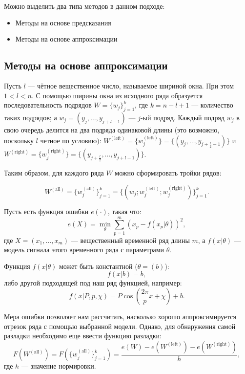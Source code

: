 \documentclass[%
12pt,
master,  %
natbib,      %
subf,        %
substylefile = spbu.rtx,
href,        %
colorlinks,  %
]{disser}
\begin{document}
Можно выделить два типа методов в данном подходе:
\begin{itemize}
	\item Методы на основе предсказания
	\item Методы на основе аппроксимации
\end{itemize}

\subsection{Методы на основе аппроксимации}

Пусть $l$ --- чётное вещественное число, называемое шириной окна. При этом  $ 1 < l < n $. С помощью ширины окна из исходного ряда образуется последовательность подрядов $W = \{ w_j \}_{j=1}^k$, где $k = n - l + 1$ --- количество таких подрядов; а $ w_j = (y_j, \dots, y_{j+l-1}) $ --- $j$-ый подряд. Каждый подряд  $w_j$  в свою очередь делится на два подряда одинаковой длины (это возможно, поскольку $l$ четное по условию): $ W^{\mathrm{(left)}} = \{w_j^{\mathrm{(left)}} \}  =  \{(y_j, \dots, y_{j+\frac{l}{2}-1}) \}$ и $W^{\mathrm{(right)}} = \{w_j^{\mathrm{(right)}} \} = \{(y_{j+\frac{l}{2}}, \dots, y_{j+l-1}) \}$.

Таким образом, для каждого ряда $W$ можно сформировать тройки рядов: 

\begin{equation*}
W^{\mathrm{(all)}} = \{w_j^{\mathrm{(all)}} \}_{j=1}^k =  \{(w_j; w_j^{\mathrm{(left)}}; w_j^{\mathrm{(right)}}) \}_{j=1}^k. 
\end{equation*}

Пусть есть функция ошибки $e(\cdot)$, такая что:
\begin{equation*}
e(X) = \min_{\theta}{\sum_{p=1}^m(x_p - f(x_p | \theta))^2 },
\end{equation*}
где $X = (x_1, \dots, x_m)$ ---  вещественный временной ряд длины $m$, а $f(x | \theta)$ --- модель сигнала этого временного ряда с параметрами $\theta$.

Функция $f(x|\theta)$ может быть константной ($\theta = (b)$):
\begin{equation*}
f(x | b) = b,
\end{equation*}
либо другой подходящей под наш ряд функцией, например:
\begin{equation*}
f(x | P, p, \chi) = P\cos(\frac{2\pi}{p}x + \chi) + b. 
\end{equation*}

Мера ошибки позволяет нам рассчитать, насколько хорошо аппроксимируется отрезок ряда с помощью выбранной модели. Однако, для обнаружения самой разладки необходимо еще ввести функцию разладки:
\begin{equation*}
F(W^{\mathrm{(all)}}) = F(\{w_j^{\mathrm{(all)}} \}_{j=1}^k ) = \frac{e(W) - e(W^{\mathrm{(left)}}) - e(W^{\mathrm{(right)}})}{h}, 
\end{equation*}
где $h$ --- значение нормировки.
\end{document}
